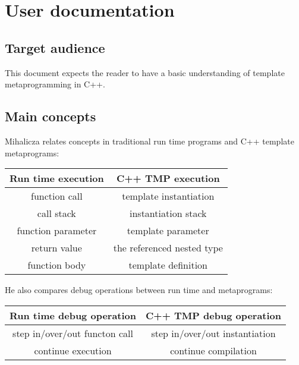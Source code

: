 

\chapter{User documentation}

\section{Target audience}

This document expects the reader to have a basic understanding of template
metaprogramming in C++.


\section{Main concepts}

Mihalicza relates concepts in traditional run time programs and C++ template
metaprograms\cite{mihalicza-phd}:

\begin{center}
    \begin{tabular}{| c | c |}
        \hline
        Run time execution & C++ TMP execution \\ \hline \hline
        function call & template instantiation \\ \hline
        call stack & instantiation stack \\ \hline
        function parameter & template parameter \\ \hline
        return value & the referenced nested type \\ \hline
        function body & template definition \\
        \hline
    \end{tabular}
\end{center}

He also compares debug operations between run time and metaprograms:

\begin{center}
    \begin{tabular}{| c | c |}
        \hline
        Run time debug operation & C++ TMP debug operation \\ \hline \hline
        step in/over/out functon call & step in/over/out instantiation \\ \hline
        continue execution & continue compilation \\
        \hline
    \end{tabular}
\end{center}



